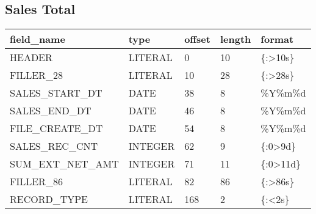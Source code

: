 \documentclass[letterpaper,10pt,english]{sphinxmanual}
\begin{document}
\subsection{Sales Total}
\label{\detokenize{cds_record_layout:sales-total}}

\begin{savenotes}\sphinxattablestart
\centering
\begin{tabulary}{\linewidth}[t]{|T|T|T|T|T|}
\hline
\sphinxstyletheadfamily 
field\_name
&\sphinxstyletheadfamily 
type
&\sphinxstyletheadfamily 
offset
&\sphinxstyletheadfamily 
length
&\sphinxstyletheadfamily 
format
\\
\hline
HEADER
&
LITERAL
&
0
&
10
&
\{:\textgreater{}10s\}
\\
\hline
FILLER\_28
&
LITERAL
&
10
&
28
&
\{:\textgreater{}28s\}
\\
\hline
SALES\_START\_DT
&
DATE
&
38
&
8
&
\%Y\%m\%d
\\
\hline
SALES\_END\_DT
&
DATE
&
46
&
8
&
\%Y\%m\%d
\\
\hline
FILE\_CREATE\_DT
&
DATE
&
54
&
8
&
\%Y\%m\%d
\\
\hline
SALES\_REC\_CNT
&
INTEGER
&
62
&
9
&
\{:0\textgreater{}9d\}
\\
\hline
SUM\_EXT\_NET\_AMT
&
INTEGER
&
71
&
11
&
\{:0\textgreater{}11d\}
\\
\hline
FILLER\_86
&
LITERAL
&
82
&
86
&
\{:\textgreater{}86s\}
\\
\hline
RECORD\_TYPE
&
LITERAL
&
168
&
2
&
\{:\textless{}2s\}
\\
\hline
\end{tabulary}
\par
\sphinxattableend\end{savenotes}



\renewcommand{\indexname}{Index}
\printindex
\end{document}
